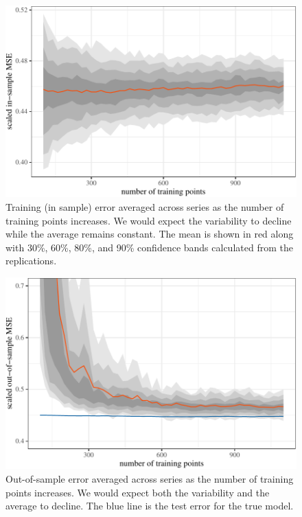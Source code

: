 \documentclass[11pt]{article}
\begin{document}
\begin{figure}[t]

{\centering \includegraphics{gfx/train-error-1} 

}

\caption{Training (in sample) error averaged across series as the number of training points increases. We would expect the variability to decline while the average remains constant. The mean is shown in red along with 30\%, 60\%, 80\%, and 90\% confidence bands calculated from the replications.}\label{fig:train-error}
\end{figure}

\begin{figure}[t]

{\centering \includegraphics{gfx/test-error-1} 

}

\caption{Out-of-sample error averaged across series as the number of training points increases. We would expect both the variability and the average to decline. The blue line is the test error for the true model.}\label{fig:test-error}
\end{figure}
\end{document}
